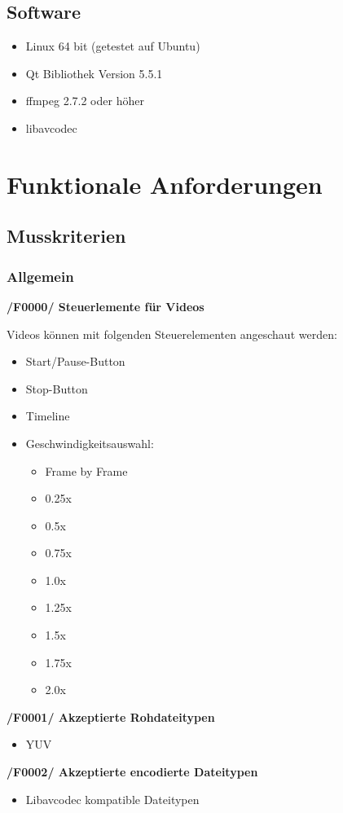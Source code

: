 \documentclass[parskip=full]{scrartcl}
\begin{document}
\subsection{Software}
\begin{itemize}
\item Linux 64 bit (getestet auf Ubuntu)
\item Qt Bibliothek Version 5.5.1
\item ffmpeg 2.7.2 oder höher
\item libavcodec
\end{itemize}
\newpage
\section{Funktionale Anforderungen}
\subsection{Musskriterien}
\subsubsection{Allgemein}
\textbf{/F0000/ Steuerlemente für Videos}

Videos können mit folgenden Steuerelementen angeschaut werden:
\begin{itemize}
\item Start/Pause-Button
\item Stop-Button
\item Timeline
\item Geschwindigkeitsauswahl:
\begin{itemize}
\item Frame by Frame
\item 0.25x
\item 0.5x
\item 0.75x
\item 1.0x
\item 1.25x
\item 1.5x
\item 1.75x
\item 2.0x
\end{itemize}
\end{itemize}

\textbf{/F0001/ Akzeptierte Rohdateitypen}

\begin{itemize}
\item YUV
\end{itemize}
\newpage
\textbf{/F0002/ Akzeptierte encodierte Dateitypen}
\begin{itemize}
\item Libavcodec kompatible Dateitypen
\end{itemize}
\end{document}
